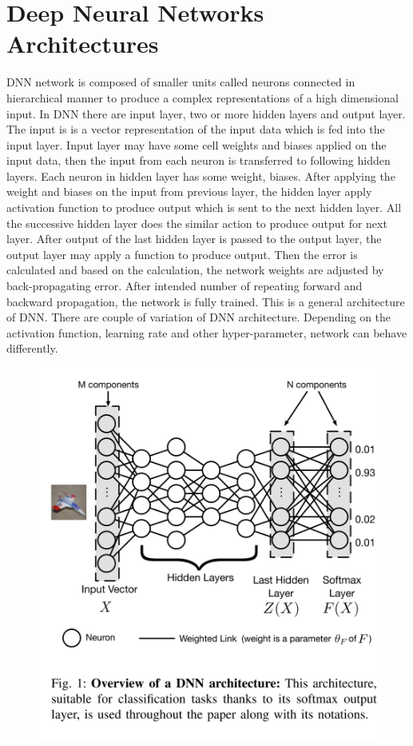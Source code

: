\documentclass[12pt]{article}
\begin{document}
\section*{Deep Neural Networks Architectures}
DNN network is composed of smaller units called neurons connected in hierarchical manner to produce a complex representations of a high dimensional input. In DNN there are input layer, two or more hidden layers and output layer. The input is is a vector representation of the input data which is fed into the input layer. Input layer may have some cell weights and biases applied on the input data, then the input from each neuron is transferred to following hidden layers. Each neuron in hidden layer has some weight, biases. After applying the weight and biases on the input from previous layer, the hidden layer apply activation function to produce output which is sent to the next hidden layer. All the successive hidden layer does the similar action to produce output for next layer. After output of the last hidden layer is passed to the output layer, the output layer may apply a function to produce output. Then the error is calculated and based on the calculation, the network weights are adjusted by back-propagating error. After intended number of repeating forward and backward propagation, the network is fully trained. This is a general architecture of DNN. There are couple of variation of DNN architecture. Depending on the activation function, learning rate and other hyper-parameter, network can behave differently.
\begin{figure}[H]
\begin{center}
\includegraphics[scale=.2]{dnn}
\end{center}
\end{figure} 
\end{document}
